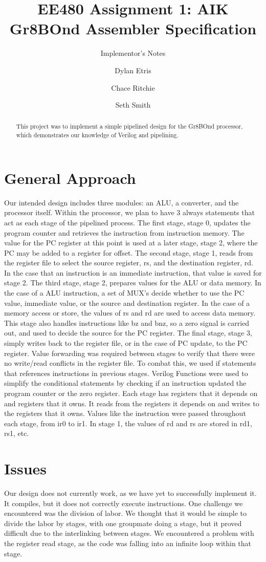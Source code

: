 \documentclass{acmart}
\begin{document}
\title{EE480 Assignment 1: AIK Gr8BOnd Assembler Specification}
\subtitle{Implementor's Notes}
\author{Dylan Etris}
\author{Chace Ritchie}
\author{Seth Smith}

\begin{abstract}
This project was to implement a simple pipelined design for the Gr8BOnd processor, 
which demonstrates our knowledge of Verilog and pipelining.
\end{abstract}
\maketitle
\fancyfoot{}
\thispagestyle{empty}
\section{General Approach}
Our intended design includes three modules: an ALU, a converter, and the processor itself.  Within the processor, 
we plan to have 3 always statements that act as each stage of the pipelined process. 
The first stage, stage 0, updates the program counter and retrieves the instruction from instruction memory. 
The value for the PC register at this point is used at a later stage, stage 2, where the PC may be added to a register for offset.
The second stage, stage 1, reads from the register file to select the source register, rs, and the destination register, rd. 
In the case that an instruction is an immediate instruction, that value is saved for stage 2.
The third stage, stage 2, prepares values for the ALU or data memory. In the case of a ALU instruction, 
a set of MUX’s decide whether to use the PC value, immediate value, or the source and destination register.  
In the case of a memory access or store, the values of rs and rd are used to access data memory. 
This stage also handles instructions like bz and bnz, so a zero signal is carried out, and used to decide the source for the PC register.
The final stage, stage 3, simply writes back to the register file, or in the case of PC update, to the PC register.
Value forwarding was required between stages to verify that there were no write/read conflicts in the register file. 
To combat this, we used if statements that references instructions in previous stages. 
Verilog Functions were used to simplify the conditional statements by checking 
if an instruction updated the program counter or the zero register.
Each stage has registers that it depends on and registers that it owns. It reads from the registers 
it depends on and writes to the registers that it owns. Values like the instruction were passed throughout each stage, 
from ir0 to ir1. In stage 1, the values of rd and rs are stored in rd1, rs1, etc.
\section{Issues}
Our design does not currently work, as we have yet to successfully implement it. It compiles, but it does not correctly execute instructions.
One challenge we encountered was the division of labor. We thought that it would be simple to divide the labor by stages, 
with one groupmate doing a stage, but it proved difficult due to the interlinking between stages. 
We encountered a problem with the register read stage, as the code was falling into an infinite loop within that stage.
\end{document}
